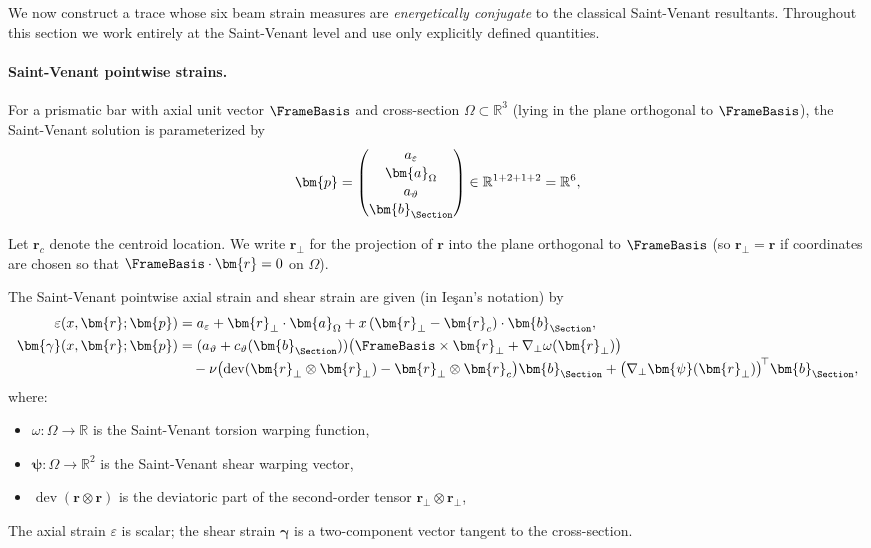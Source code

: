 

We now construct a trace whose six beam strain measures are \emph{energetically
conjugate} to the classical Saint-Venant resultants. 
Throughout this section we
work entirely at the Saint-Venant level and use only explicitly defined
quantities.

\paragraph{Saint-Venant pointwise strains.}

For a prismatic bar with axial unit vector $\FrameBasis$ and cross-section
$\Omega \subset \mathbb{R}^3$ (lying in the plane orthogonal to $\FrameBasis$), the
Saint-Venant solution is parameterized by
\[
\bm{p} =
\begin{pmatrix}
a_\varepsilon \\[1pt]
\bm{a}_\Omega \\[1pt]
a_\vartheta \\[1pt]
\bm{b}_{\Section}
\end{pmatrix}
\in \mathbb{R}^{1+2+1+2} = \mathbb{R}^6,
\]

Let
$\bm{r}_c$ denote the centroid location. We write $\bm{r}_\perp$ for the
projection of $\bm{r}$ into the plane orthogonal to $\FrameBasis$ (so
$\bm{r}_\perp = \bm{r}$ if coordinates are chosen so that
$\FrameBasis\cdot\bm{r}=0$ on $\Omega$).

The Saint-Venant pointwise axial strain and shear strain are given (in
Ieşan's notation) by
\begin{subequations}
\begin{align}
\varepsilon(x,\bm{r};\bm{p})
&= a_\varepsilon + \bm{r}_\perp\cdot\bm{a}_\Omega
+ x\,(\bm{r}_\perp-\bm{r}_c)\cdot\bm{b}_{\Section},
\label{eq:sv-point-axial-strain} \\
\bm{\gamma}(x,\bm{r};\bm{p})
&= (a_\vartheta + c_\vartheta(\bm{b}_{\Section}))
\bigl(\FrameBasis\times \bm{r}_\perp + \nabla_\perp \omega(\bm{r}_\perp)\bigr)
\nonumber\\[-2pt]
&\quad
- \nu \bigl(\operatorname{dev}(\bm{r}_\perp\otimes\bm{r}_\perp)
- \bm{r}_\perp\otimes\bm{r}_c\bigr)\bm{b}_{\Section}
+ \bigl(\nabla_\perp \bm{\psi}(\bm{r}_\perp)\bigr)^{\!\top} \bm{b}_{\Section},
\label{eq:sv-point-shear-strain}
\end{align}
\label{eq:sv-point-strain}
\end{subequations}
where:
\begin{itemize}
\item $\omega : \Omega \to \mathbb{R}$ is the Saint-Venant torsion warping
      function,
\item $\bm{\psi} : \Omega \to \mathbb{R}^2$ is the Saint-Venant shear warping
      vector,
\item $\operatorname{dev}(\bm{r}\otimes\bm{r})$ is the deviatoric
      part of the second-order tensor $\bm{r}_\perp\otimes\bm{r}_\perp$,
\end{itemize}
The axial strain $\varepsilon$ is scalar; the shear strain $\bm{\gamma}$ is a
two-component vector tangent to the cross-section.


